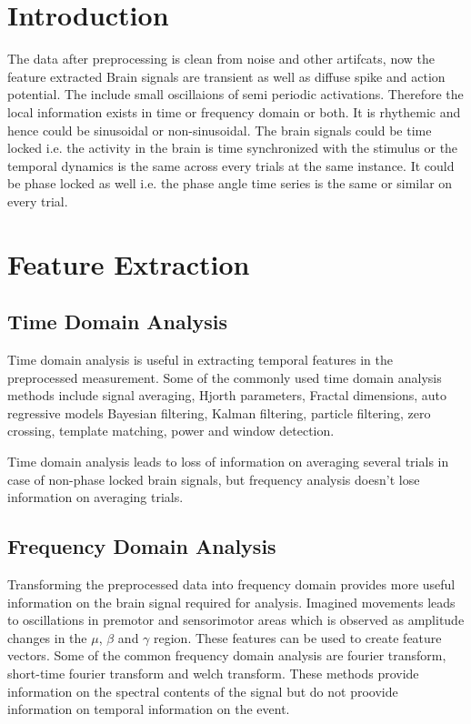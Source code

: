 \section*{Introduction}
The data after preprocessing is clean from noise and other artifcats, now the feature extracted 
Brain signals are transient as well as diffuse spike and action potential. The include small oscillaions of 
semi periodic activations. Therefore the local information exists in time or frequency domain or both.
It is rhythemic and hence could be sinusoidal or non-sinusoidal. 
The brain signals could be time locked i.e. the activity in the brain is time synchronized with the stimulus or the temporal dynamics is the same across 
every trials at the same instance. It could be phase locked as well i.e. the phase angle time series is the same or similar on every trial.



\section{Feature Extraction}


\subsection{Time Domain Analysis}
Time domain analysis is useful in extracting temporal features in the preprocessed measurement. Some of the commonly
used time domain analysis methods include signal averaging, Hjorth parameters, Fractal dimensions, auto regressive models
Bayesian filtering, Kalman filtering, particle filtering, zero crossing, template matching, power and window detection.

Time domain analysis leads to loss of information on averaging several trials in case of non-phase locked brain signals, but 
frequency analysis doesn't lose information on averaging trials.

\subsection{Frequency Domain Analysis}
Transforming the preprocessed data into frequency domain provides more useful information on the brain signal required for analysis.
Imagined movements leads to oscillations in premotor and sensorimotor areas which is observed as amplitude changes in the $\mu$, $\beta$ and $\gamma$ region.
These features can be used to create feature vectors. Some of the common frequency domain analysis are fourier transform, short-time fourier transform 
and welch transform. These methods provide information on the spectral contents of the signal but do not proovide information on 
temporal information on the event. 

